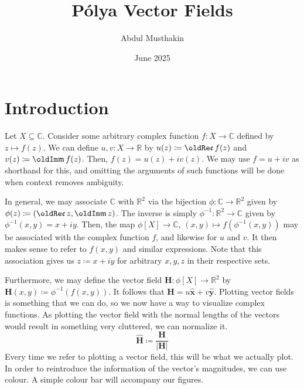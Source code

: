 \documentclass[a4paper]{article}
\title{P\'olya Vector Fields}
\author{Abdul Musthakin}
\date{June 2025}
\newcommand{\R}{\mathbb{R}}
\newcommand{\C}{\mathbb{C}}
\renewcommand{\Im}{\mathop{\oldIm\mathfrak{m}}}
\renewcommand{\Re}{\mathop{\oldRe\mathfrak{e}}}
\theoremstyle{definition}
\begin{document}
\maketitle

\section{Introduction}

Let $X \subseteq \C$.
Consider some arbitrary complex function $f \colon X \to \C$ defined by $z \mapsto f(z)$.
We can define $u,v \colon X \to \R$ by $u(z) \coloneq \Re f (z)$ and $v(z) \coloneq \Im f(z)$.
Then, $f(z) = u(z) + i v(z)$.
We may use $f = u + i v$ as shorthand for this, and omitting the arguments of such functions will be done when context removes ambiguity.

In general, we may associate $\mathbb{C}$ with $\R^2$ via the bijection $\phi \colon \C \to \R^2$ given by $\phi(z) \coloneq (\Re z, \Im z)$.
The inverse is simply $\phi^{-1} \colon \R^2 \to \C$ given by $\phi^{-1}(x,y) = x + iy$.
Then, the map $\phi[X] \to \C$, $(x,y) \mapsto f\left(\phi^{-1}(x,y)\right)$ may be associated with the complex function $f$, and likewise for $u$ and $v$.
It then makes sense to refer to $f(x,y)$ and similar expressions.
Note that this association gives us $z \coloneq x + iy$ for arbitrary $x,y,z$ in their respective sets.

Furthermore, we may define the vector field $\mathbf{H} \colon \phi[X] \to \R^2$ by $\mathbf{H}(x,y) \coloneq \phi^{-1} (f(x,y))$.
It follows that $\mathbf{H} = u\mathbf{\hat{x}} + v\mathbf{\hat{y}}$.
Plotting vector fields is something that we can do, so we now have a way to visualize complex functions.
As plotting the vector field with the normal lengths of the vectors would result in something very cluttered, we can normalize it.
\begin{equation*}
    \mathbf{\hat{H}} \coloneq \frac{\mathbf{H}}{\lvert \mathbf{H} \rvert}
\end{equation*}
Every time we refer to plotting a vector field, this will be what we actually plot.
In order to reintroduce the information of the vector's magnitudes, we can use colour.
A simple colour bar will accompany our figures.
\end{document}
